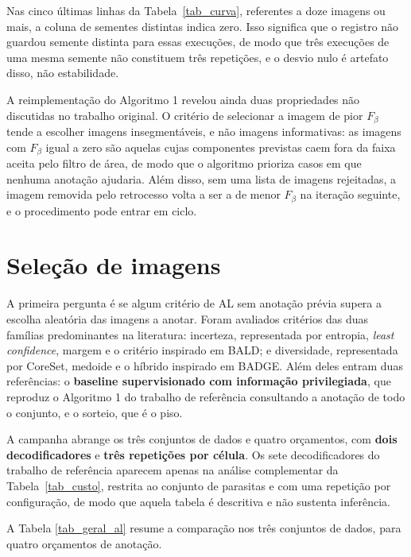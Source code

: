 Nas cinco últimas linhas da Tabela~\ref{tab_curva}, referentes a doze imagens ou mais, a coluna de sementes distintas indica zero. Isso significa que o registro não guardou semente distinta para essas execuções, de modo que três execuções de uma mesma semente não constituem três repetições, e o desvio nulo é artefato disso, não estabilidade.

A reimplementação do Algoritmo 1 revelou ainda duas propriedades não discutidas no trabalho original. O critério de selecionar a imagem de pior $F_\beta$ tende a escolher imagens insegmentáveis, e não imagens informativas: as imagens com $F_\beta$ igual a zero são aquelas cujas componentes previstas caem fora da faixa aceita pelo filtro de área, de modo que o algoritmo prioriza casos em que nenhuma anotação ajudaria. Além disso, sem uma lista de imagens rejeitadas, a imagem removida pelo retrocesso volta a ser a de menor $F_\beta$ na iteração seguinte, e o procedimento pode entrar em ciclo.

\section{Seleção de imagens}

A primeira pergunta é se algum critério de \ac{AL} sem anotação prévia supera a escolha aleatória das imagens a anotar. Foram avaliados critérios das duas famílias predominantes na literatura: incerteza, representada por entropia, \textit{least confidence}, margem e o critério inspirado em \ac{BALD}; e diversidade, representada por CoreSet, medoide e o híbrido inspirado em \ac{BADGE}. Além deles entram duas referências: o \textbf{baseline supervisionado com informação privilegiada}, que reproduz o Algoritmo 1 do trabalho de referência consultando a anotação de todo o conjunto, e o sorteio, que é o piso.

A campanha abrange os três conjuntos de dados e quatro orçamentos, com \textbf{dois decodificadores} e \textbf{três repetições por célula}. Os sete decodificadores do trabalho de referência aparecem apenas na análise complementar da Tabela~\ref{tab_custo}, restrita ao conjunto de parasitas e com uma repetição por configuração, de modo que aquela tabela é descritiva e não sustenta inferência.

A Tabela \ref{tab_geral_al} resume a comparação nos três conjuntos de dados, para quatro orçamentos de anotação.

\begin{table}[htb]
\centering
\caption{Critérios de Active Learning por orçamento e conjunto de dados.}
\label{tab_geral_al}

\end{table}

